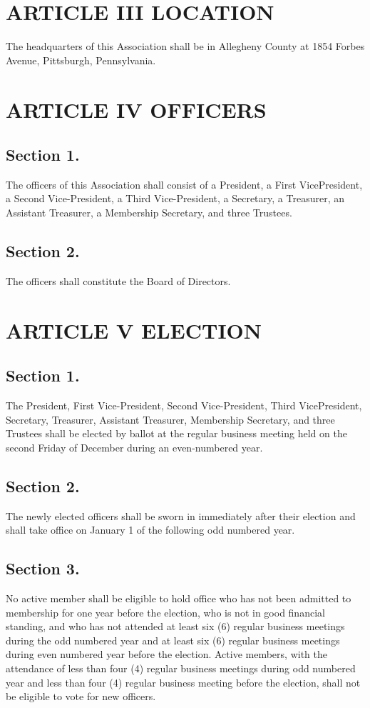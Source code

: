 \documentclass[12pt,letterpaper]{article}
\begin{document}
\section*{ARTICLE III
LOCATION}

The headquarters of this Association shall be in Allegheny County at 1854 Forbes
Avenue, Pittsburgh, Pennsylvania.

\section*{ARTICLE IV
OFFICERS}
\subsection*{Section 1.} The officers of this Association shall consist of a President, a First VicePresident, a Second Vice-President, a Third Vice-President, a Secretary, a Treasurer, an
Assistant Treasurer, a Membership Secretary, and three Trustees.
\subsection*{Section 2.} The officers shall constitute the Board of Directors.

\section*{ARTICLE V
ELECTION}

\subsection*{Section 1.} The President, First Vice-President, Second Vice-President, Third VicePresident, Secretary, Treasurer, Assistant Treasurer, Membership Secretary, and three
Trustees shall be elected by ballot at the regular business meeting held on the second
Friday of December during an even-numbered year.
\subsection*{Section 2.} The newly elected officers shall be sworn in immediately after their election
and shall take office on January 1 of the following odd numbered year.
\subsection*{Section 3.} No active member shall be eligible to hold office who has not been
admitted to membership for one year before the election, who is not in good financial
standing, and who has not attended at least six (6) regular business meetings during
the odd numbered year and at least six (6) regular business meetings during even
numbered year before the election. Active members, with the attendance of less than
four (4) regular business meetings during odd numbered year and less than four (4)
regular business meeting before the election, shall not be eligible to vote for new
officers.
\end{document}
